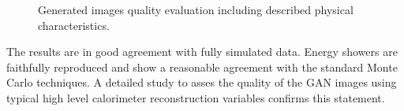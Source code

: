 \documentclass{webofc}
\begin{document}
\begin{figure}[h]
  \centering
  \caption{Generated images quality evaluation including described physical characteristics.}
  \label{fig:quality}
\end{figure}

The results are in good agreement with fully simulated data. Energy showers are faithfully reproduced and show a reasonable agreement with the standard Monte Carlo techniques. A detailed study to asses the quality of the GAN images using typical high level calorimeter reconstruction variables confirms this statement.
\end{document}
